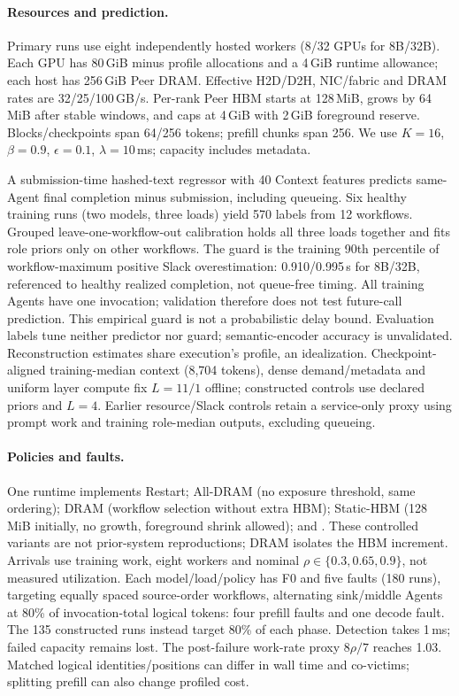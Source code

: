 \paragraph{Resources and prediction.}
Primary runs use eight independently hosted workers (8/32 GPUs for 8B/32B).
Each GPU has 80\,GiB minus profile allocations and a 4\,GiB runtime allowance;
each host has 256\,GiB Peer DRAM. Effective H2D/D2H, NIC/fabric and DRAM rates
are 32/25/100\,GB/s. Per-rank Peer HBM starts at 128\,MiB, grows by 64\,MiB
after stable windows, and caps at 4\,GiB with 2\,GiB foreground reserve.
Blocks/checkpoints span 64/256 tokens; prefill chunks span 256.
We use $K=16$, $\beta=0.9$, $\epsilon=0.1$, $\lambda=10$\,ms;
capacity includes metadata.

A submission-time hashed-text regressor with 40 Context features predicts
same-Agent final completion minus submission, including queueing. Six healthy
training runs (two models, three loads) yield 570 labels from 12 workflows.
Grouped leave-one-workflow-out calibration holds all three loads together and
fits role priors only on other workflows. The guard is the training 90th
percentile of workflow-maximum positive Slack overestimation: 0.910/0.995\,s
for 8B/32B, referenced to healthy realized completion, not queue-free timing.
All training Agents have one invocation; validation therefore does not test
future-call prediction. This empirical guard is not a probabilistic delay bound.
Evaluation labels tune neither predictor nor guard; semantic-encoder accuracy
is unvalidated. Reconstruction estimates share execution's profile, an idealization.
Checkpoint-aligned training-median context (8,704 tokens), dense demand/metadata and uniform
layer compute fix $L=11/1$ offline; constructed controls use declared priors
and $L=4$. Earlier resource/Slack controls retain a service-only proxy using
prompt work and training role-median outputs, excluding queueing.

\paragraph{Policies and faults.}
One runtime implements Restart; All-DRAM (no exposure threshold, same ordering);
DRAM (workflow selection without extra HBM); Static-HBM (128\,MiB initially,
no growth, foreground shrink allowed); and \system. These controlled variants
are not prior-system reproductions; DRAM isolates the HBM increment.
Arrivals use training work, eight workers and nominal
$\rho\in\{0.3,0.65,0.9\}$, not measured utilization.
Each model/load/policy has F0 and five faults (180 runs), targeting equally
spaced source-order workflows, alternating sink/middle Agents at 80\% of
invocation-total logical tokens: four prefill faults and one decode fault.
The 135 constructed runs instead target 80\% of each phase.
Detection takes 1\,ms; failed capacity remains lost. The post-failure work-rate
proxy $8\rho/7$ reaches 1.03. Matched logical identities/positions can differ
in wall time and co-victims; splitting prefill can also change profiled cost.

